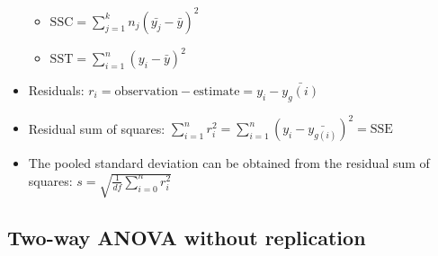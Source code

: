 \documentclass{article}
\begin{document}
\begin{itemize}
\begin{itemize}
        \item $\text{SSC}=\sum_{j=1}^k n_j(\bar{y_j}-\bar{y})^2$
        \item $\text{SST}=\sum_{i=1}^n (y_i -\bar{y})^2$
    \end{itemize}
    \item Residuals: $r_i=\text{observation}-\text{estimate}=y_i-\bar{y_g(i)}$
    \item Residual sum of squares: $\sum_{i=1}^{n} r_i^2=\sum_{i=1}^{n}(y_i-\bar{y_{g(i)}})^2=\text{SSE}$
    \item The pooled standard deviation can be obtained from the residual sum of squares: $s=\sqrt{\frac{1}{df} \sum_{i=0}^{n} r_i^2}$
\end{itemize}

\subsection{Two-way ANOVA without replication}
\end{document}
